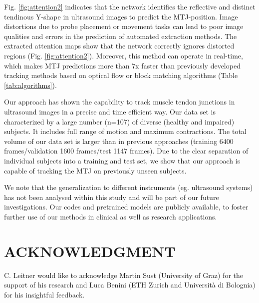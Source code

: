 \documentclass[letterpaper, 10 pt, conference]{ieeeconf}
\begin{document}
Fig. \ref{fig:attention2} indicates that the network identifies the reflective and distinct tendinous Y-shape in ultrasound images to predict the MTJ-position. Image distortions due to probe placement or movement tasks can lead to poor image qualities and errors in the prediction of automated extraction methods. The extracted attention maps show that the network correctly ignores distorted regions (Fig. \ref{fig:attention2}). Moreover, this method can operate in real-time, which makes MTJ predictions more than 7x faster than previously developed tracking methods based on optical flow or block matching algorithms (Table \ref{tab:algorithms}). 

Our approach has shown the capability to track muscle tendon junctions in ultrasound images in a precise and time efficient way. Our data set is characterized by a large number (n=107) of diverse (healthy and impaired) subjects. It includes full range of motion and maximum contractions. The total volume of our data set is larger than in previous approaches (training 6400 frames/validation 1600 frames/test 1147 frames). Due to the clear separation of individual subjects into a training and test set, we show that our approach is capable of tracking the MTJ on previously unseen subjects.

We note that the generalization to different instruments (eg. ultrasound systems) has not been analysed within this study and will be part of our future investigations. Our codes and pretrained models are publicly available, to foster further use of our methods in clinical as well as research applications.







\section*{ACKNOWLEDGMENT}
C. Leitner would like to acknowledge Martin Sust (University of Graz) for the support of his research and Luca Benini (ETH Zurich and Universit\`{a} di Bolognia) for his insightful feedback.


\end{document}
